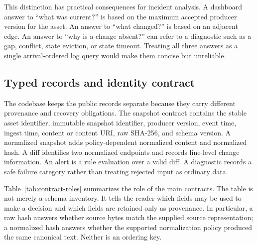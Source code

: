 This distinction has practical consequences for incident analysis. A dashboard answer to ``what was current?'' is based on the maximum accepted producer version for the asset. An answer to ``what changed?'' is based on an adjacent edge. An answer to ``why is a change absent?'' can refer to a diagnostic such as a gap, conflict, state eviction, or state timeout. Treating all three answers as a single arrival-ordered log query would make them concise but unreliable.

\subsection{Typed records and identity contract}

The codebase keeps the public records separate because they carry different provenance and recovery obligations. The snapshot contract contains the stable asset identifier, immutable snapshot identifier, producer version, event time, ingest time, content or content URI, raw SHA-256, and schema version. A normalized snapshot adds policy-dependent normalized content and normalized hash. A diff identifies two normalized endpoints and records line-level change information. An alert is a rule evaluation over a valid diff. A diagnostic records a safe failure category rather than treating rejected input as ordinary data.

Table~\ref{tab:contract-roles} summarizes the role of the main contracts. The table is not merely a schema inventory. It tells the reader which fields may be used to make a decision and which fields are retained only as provenance. In particular, a raw hash answers whether source bytes match the supplied source representation; a normalized hash answers whether the supported normalization policy produced the same canonical text. Neither is an ordering key.

